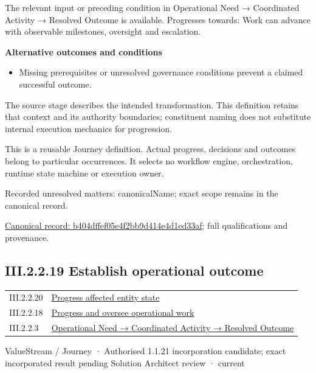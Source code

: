 The relevant input or preceding condition in Operational Need → Coordinated Activity → Resolved Outcome is available. Progresses towards: Work can advance with observable milestones, oversight and escalation.



\par\medskip\textbf{Alternative outcomes and conditions}\par


\begin{itemize}


\item Missing prerequisites or unresolved governance conditions prevent a claimed successful outcome.

\end{itemize}


The source stage describes the intended transformation. This definition retains that context and its authority boundaries; constituent naming does not substitute internal execution mechanics for progression.



This is a reusable Journey definition. Actual progress, decisions and outcomes belong to particular occurrences. It selects no workflow engine, orchestration, runtime state machine or execution owner.


{\small Recorded unresolved matters: canonicalName; exact scope remains in the canonical record.}\par
{\footnotesize \href{../../../../continuum/strategy/value-stream/b404dffef05e4f2bb9d414e4d1ed33af.md}{Canonical record: b404dffef05e4f2bb9d414e4d1ed33af}; full qualifications and provenance.}\par
\subsection*{III.2.2.19 Establish operational outcome}
\label{navigation:III.2.2.19}

\begin{longtable}{p{.22\linewidth}p{.73\linewidth}}
III.2.2.20 & \hyperref[element:57880d06fd0b47d2a19d695afd7d48fc]{Progress affected entity state} \\
III.2.2.18 & \hyperref[element:b404dffef05e4f2bb9d414e4d1ed33af]{Progress and oversee operational work} \\
III.2.2.3 & \hyperref[element:beea615ca7b34bbcbd0ad3a2a6ab2cff]{Operational Need → Coordinated Activity → Resolved Outcome} \\
\end{longtable}
\label{element:79f756815e3645eb82a150870dc12502}
{\small ValueStream / Journey · Authorised 1.1.21 incorporation candidate; exact incorporated result pending Solution Architect review · current}\par

